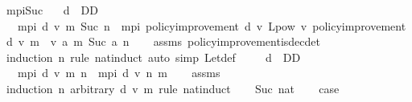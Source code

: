 \begin{isabellebody}
\isanewline
{}\isamarkupfalse%
\ mpi{\isacharunderscore}{\kern0pt}Suc{\isacharprime}{\kern0pt}{\isacharcolon}{\kern0pt}\isanewline
\ \ \ {\isachardoublequoteopen}d\ {\isasymin}\ D\isactrlsub D{\isachardoublequoteclose}\isanewline
\ \ \ {\isachardoublequoteopen}mpi\ d\ v\ m\ {\isacharparenleft}{\kern0pt}Suc\ n{\isacharparenright}{\kern0pt}\ {\isacharequal}{\kern0pt}\ mpi\ {\isacharparenleft}{\kern0pt}policy{\isacharunderscore}{\kern0pt}improvement\ d\ v{\isacharparenright}{\kern0pt}\ {\isacharparenleft}{\kern0pt}L{\isacharunderscore}{\kern0pt}pow\ v\ {\isacharparenleft}{\kern0pt}policy{\isacharunderscore}{\kern0pt}improvement\ d\ v{\isacharparenright}{\kern0pt}\ {\isacharparenleft}{\kern0pt}m\ {}\ v{\isacharparenright}{\kern0pt}{\isacharparenright}{\kern0pt}\ {\isacharparenleft}{\kern0pt}{\isasymlambda}a{\isachardot}{\kern0pt}\ m\ {\isacharparenleft}{\kern0pt}Suc\ a{\isacharparenright}{\kern0pt}{\isacharparenright}{\kern0pt}\ n{\isachardoublequoteclose}\isanewline
%
\isadelimproof
\ \ %
\endisadelimproof
%
\isatagproof
{}\isamarkupfalse%
\ assms\ policy{\isacharunderscore}{\kern0pt}improvement{\isacharunderscore}{\kern0pt}is{\isacharunderscore}{\kern0pt}dec{\isacharunderscore}{\kern0pt}det\isanewline
\ \ \isamarkupfalse%
\ {\isacharparenleft}{\kern0pt}induction\ n\ rule{\isacharcolon}{\kern0pt}\ nat{\isachardot}{\kern0pt}induct{\isacharparenright}{\kern0pt}\ {\isacharparenleft}{\kern0pt}auto\ simp{\isacharcolon}{\kern0pt}\ Let{\isacharunderscore}{\kern0pt}def{\isacharparenright}{\kern0pt}%
\endisatagproof
{\isafoldproof}%
%
\isadelimproof
\isanewline
%
\endisadelimproof
\isanewline
{}\isamarkupfalse%
\ \isanewline
\ \ \ {\isachardoublequoteopen}d\ {\isasymin}\ D\isactrlsub D{\isachardoublequoteclose}\isanewline
\ \ \ {\isachardoublequoteopen}mpi\ d\ v\ m\ n\ {\isacharequal}{\kern0pt}\ mpi{\isacharprime}{\kern0pt}\ d\ v\ n\ m{\isachardoublequoteclose}\isanewline
%
\isadelimproof
\ \ %
\endisadelimproof
%
\isatagproof
{}\isamarkupfalse%
\ assms\isanewline
{}\isamarkupfalse%
\ {\isacharparenleft}{\kern0pt}induction\ n\ arbitrary{\isacharcolon}{\kern0pt}\ d\ v\ m\ rule{\isacharcolon}{\kern0pt}\ nat{\isachardot}{\kern0pt}induct{\isacharparenright}{\kern0pt}\isanewline
\ \ \isamarkupfalse%
\ {\isacharparenleft}{\kern0pt}Suc\ nat{\isacharparenright}{\kern0pt}\isanewline
\ \ \isamarkupfalse%
\ {\isacharquery}{\kern0pt}case\isanewline
\ \ \ \ \isamarkupfalse%

\end{isabellebody}
